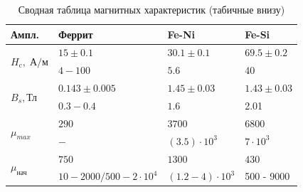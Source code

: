\documentclass[a4paper,11pt]{extarticle} %
\begin{document}
\begin{table}[h]
	\centering
	\begin{tabular}{|l|l|l|l|}
		\hline
		Ампл.                          & Феррит           & Fe-Ni           & Fe-Si          \\ \hline
		\multirow{2}{*}{$H_\text{c}, \; \text{А/м}$} & $15\pm 0.1$      & $30.1\pm 0.1$   & $69.5\pm 0.2$  \\ \cline{2-4} 
		& $4-100$             & $5.6$       & $40$          \\ \hline
		\multirow{2}{*}{$B_s, \text{Тл}$}     & $0.143\pm 0.005$ & $1.45\pm 0.03$  & $1.43\pm 0.03$ \\ \cline{2-4} 
		& $0.3 - 0.4$           & $1.6$   & 2.01              \\ \hline
		\multirow{2}{*}{$\mu_{max}$}     & $290$ & $3700$  & $6800$ \\ \cline{2-4} 
		& $-$           & $(3.5) \cdot 10^3$   & $7\cdot 10^3$             \\ \hline
		
		\multirow{2}{*}{$\mu_{\text{нач}}$}     & $750$ & $1300$  & $430$ \\ \cline{2-4} 
		& $10 - 2000 / 500 - 2\cdot 10^4$           & $(1.2 - 4)\cdot 10^3$   & 500 - 9000              \\ \hline
		
		
	\end{tabular}
	\caption{Сводная таблица магнитных характеристик (табичные внизу)}
	\label{tab:my-table}
\end{table}
\end{document}
